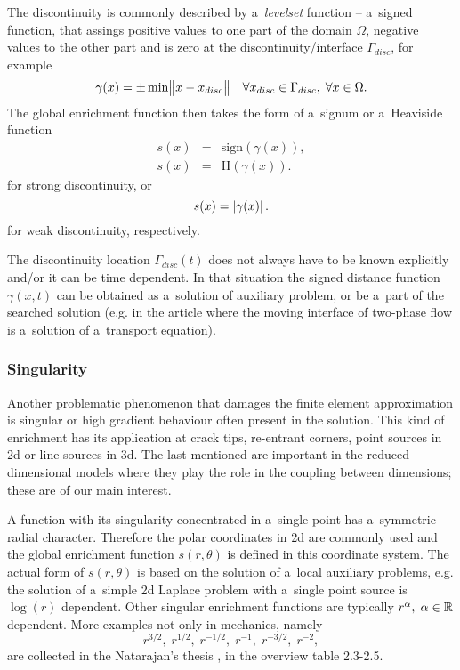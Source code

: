 The discontinuity is commonly described by a~\emph{levelset} function -- a~signed function,
that assings positive values to one part of the domain $\Omega$, negative values to the other part and is zero at the discontinuity/interface $\Gamma_{disc}$, for example
\[
    \gamma(x) = \pm \min \bigl\Vert x-x_{disc}\bigr\Vert \quad \forall x_{disc} \in \Gamma_{disc},\; \forall x \in \Omega.
\]
The global enrichment function then takes the form of a~signum or a~Heaviside function
\begin{eqnarray}
    s(x) &=& \textrm{sign}(\gamma(x)),\\
    s(x) &=& \textrm{H}(\gamma(x)).
\end{eqnarray}
for strong discontinuity, or
\begin{equation}
    s(x) = \left|\gamma(x)\right|.
\end{equation}
for weak discontinuity, respectively.

The discontinuity location $\Gamma_{disc}(t)$ does not always have to be known explicitly and/or it can be time dependent.
In that situation the signed distance function $\gamma(x,t)$ can be obtained as a~solution of auxiliary problem, or be a~part of
the searched solution (e.g. in the article \cite{sauerland_stable_2013}
where the moving interface of two-phase flow is a~solution of a~transport equation).


\subsubsection{Singularity} \label{sec:glob_enr_singularity}
Another problematic phenomenon that damages the finite element approximation is singular or high gradient behaviour often present in the solution.
This kind of enrichment has its application at crack tips, re-entrant corners, point sources in 2d or line sources in 3d.
The last mentioned are important in the reduced dimensional models where they play the role in the coupling between dimensions;
these are of our main interest.

A function with its singularity concentrated in a~single point has a~symmetric radial character.
Therefore the polar coordinates in 2d are commonly used and the global enrichment function $s(r,\theta)$ is defined in this coordinate system.
The actual form of $s(r,\theta)$ is based on the solution of a~local auxiliary problems, e.g. the solution of a~simple 2d Laplace problem with a~single point source 
is $\log(r)$ dependent. Other singular enrichment functions are typically $r^\alpha,\;\alpha\in\mathbb{R}$ dependent.
More examples not only in mechanics, namely
\[ r^{3/2},\;r^{1/2},\;r^{-1/2},\;r^{-1},\;r^{-3/2},\; r^{-2}, \]
are collected in the Natarajan's thesis \cite{natarajan_enriched_2011}, in the overview table 2.3-2.5.

